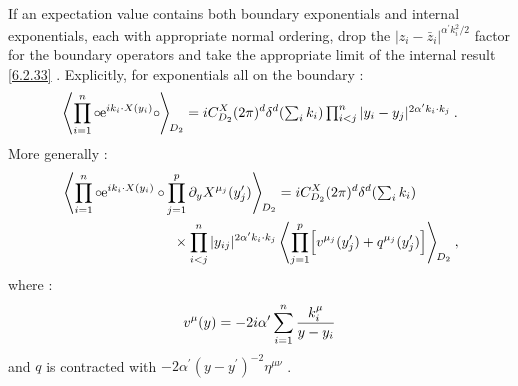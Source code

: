 If an expectation value contains both boundary exponentials and internal exponentials, each with appropriate normal ordering, drop the $|z_{i}-\bar{z}_{i}|^{\alpha^{\prime} k_{i}^{2} / 2}$ factor for the boundary operators and take the appropriate limit of the internal result \eqref{6.2.33} . Explicitly, for exponentials all on the boundary :
\begin{equation}
	\left\langle\prod_{i=1}^{n} \circ\mkern-1mu \mathrm{e}^{i k_{i} \cdot X(y_{i})} \circ\mkern-1mu \right\rangle\bigg._{\!\!D_{2}}
	=i C_{D_{2}}^{X}(2 \pi)^{d} \delta^{d}(\textstyle{\sum_{i} k_{i}} ) 
	\prod_{i<j}^{n}|y_{i}-y_{j}|^{2 \alpha^{\prime} k_{i} \cdot k_{j}} \:. \label{6.2.35}
\end{equation}
More generally :
\begin{align}
	& \left\langle\prod_{i=1}^{n} \circ\mkern-1mu \mathrm{e}^{i k_{i} \cdot X(y_{i})} \circ\mkern-1mu 
	\prod_{j=1}^{p} \partial_{y}X^{\mu_{j}}(y_{j}^{\prime})\right\rangle\bigg._{\!\!D_{2}}
	= i C_{D_{2}}^{X}(2 \pi)^{d} \delta^{d}({\textstyle \sum_{i} k_{i}})  \nonumber \\
	&\qquad \qquad \qquad \qquad  \times \prod_{i<j}^{n}|y_{i j}|^{2 \alpha^{\prime} k_{i} \cdot k_{j}}
	\left\langle\prod_{j=1}^{p}\Bigl[v^{\mu_{j}}(y_{j}^{\prime})+q^{\mu_{j}}(y_{j}^{\prime})\Bigr]\right\rangle\bigg._{\!\!D_{2}} \:, 
	\label{6.2.36}
\end{align}
where :
\begin{equation}
	v^{\mu}(y)=-2 i \alpha^{\prime} \sum_{i=1}^{n} \frac{k_{i}^{\mu}}{y-y_{i}} \label{6.2.37}
\end{equation}
and $q$ is contracted with $-2 \alpha^{\prime}(y-y^{\prime})^{-2} \eta^{\mu \nu}$ .

